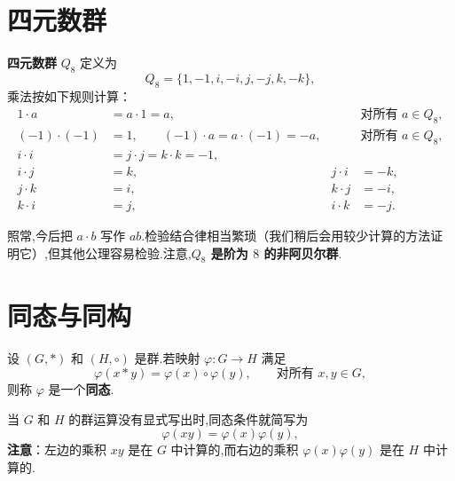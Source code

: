 \section{四元数群}

\begin{definition}
	\textbf{四元数群} $Q_8$ 定义为
\[
Q_8=\{1,-1,i,-i,j,-j,k,-k\},
\]
乘法按如下规则计算：
\begin{align*}
	1\cdot a&=a\cdot1=a, &&\text{对所有 }a\in Q_8,\\
	(-1)\cdot(-1)&=1,\qquad (-1)\cdot a=a\cdot(-1)=-a, &&\text{对所有 }a\in Q_8,\\
	i\cdot i&=j\cdot j=k\cdot k=-1,\\
	i\cdot j&=k, & j\cdot i&=-k,\\
	j\cdot k&=i, & k\cdot j&=-i,\\
	k\cdot i&=j, & i\cdot k&=-j.
\end{align*}
\end{definition}
照常,今后把 $a\cdot b$ 写作 $ab$.检验结合律相当繁琐（我们稍后会用较少计算的方法证明它）,但其他公理容易检验.注意,\textbf{$Q_8$ 是阶为 $8$ 的非阿贝尔群}.
\section{同态与同构}
\begin{definition}
	设 $(G,*)$ 和 $(H,\circ)$ 是群.若映射 $\varphi:G\to H$ 满足
\[
\varphi(x*y)=\varphi(x)\circ\varphi(y),\qquad\text{对所有 }x,y\in G,
\]
则称 $\varphi$ 是一个\textbf{同态}.

\end{definition}
当 $G$ 和 $H$ 的群运算没有显式写出时,同态条件就简写为
\[
\varphi(xy)=\varphi(x)\varphi(y),
\]
\textbf{注意}：左边的乘积 $xy$ 是在 $G$ 中计算的,而右边的乘积 $\varphi(x)\varphi(y)$ 是在 $H$ 中计算的.


